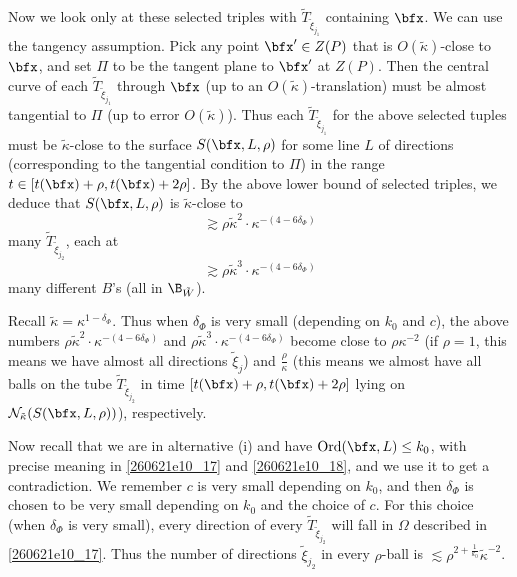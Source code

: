 \documentclass{article}
\numberwithin{equation}{section}
\theoremstyle{plain}
\begin{document}
Now we look only at these selected triples with $\tilde{T}_{\tilde{\xi}_{j_1}}$ containing $\bfx$. We can use the tangency assumption. Pick any point $\bfx' \in Z(P)$ that is $O(\tilde{\kappa})$-close to $\bfx$, and set $\Pi$ to be the tangent plane to $\bfx'$ at $Z(P)$. Then the central curve of each $\tilde{T}_{\tilde{\xi}_{j_1}}$ through $\bfx$ (up to an $O(\tilde{\kappa})$-translation) must be almost tangential to $\Pi$ (up to error $O(\tilde{\kappa})$). Thus each  $\tilde{T}_{\tilde{\xi}_{j_1}}$ for the above selected tuples must be $\tilde{\kappa}$-close to the surface $S(\bfx, L, \rho)$ for some line $L$ of directions (corresponding to the tangential condition to $\Pi$) in the range $t \in [t(\bfx)+\rho, t(\bfx)+2\rho]$. By the above lower bound of selected triples, we deduce that $S(\bfx, L, \rho)$ is $\tilde{\kappa}$-close to 
\begin{equation}
    \gtrsim \rho\tilde{\kappa}^2\cdot \kappa^{-(4-6\delta_{\Phi})}
\end{equation}
many $\tilde{T}_{\tilde{\xi}_{j_2}}$, each at 
\begin{equation}
    \gtrsim \rho\tilde{\kappa}^3\cdot \kappa^{-(4-6\delta_{\Phi})}
\end{equation}
many different $B$'s (all in $\B_{\tilde{W}}$).

Recall $\tilde{\kappa} = \kappa^{1-\delta_{\Phi}}$. Thus when $\delta_{\Phi}$ is very small (depending on $k_0$ and $c$), the above numbers $\rho\tilde{\kappa}^2\cdot \kappa^{-(4-6\delta_{\Phi})}$ and $\rho\tilde{\kappa}^3\cdot \kappa^{-(4-6\delta_{\Phi})}$ become close to $\rho\kappa^{-2}$ (if $\rho=1$, this means we have almost all directions $\tilde{\xi}_j$) and $\frac{\rho}{\kappa}$ (this means we almost have all balls on the tube $\tilde{T}_{\tilde{\xi}_{j_2}}$ in time $[t(\bfx)+\rho, t(\bfx)+2\rho]$ lying on $\mathcal{N}_{\tilde{\kappa}} (S(\bfx, L, \rho))$), respectively.

Now recall that we are in alternative (i) and have $\mathrm{Ord}(\bfx, L)\le k_0$, with precise meaning in \eqref{260621e10_17} and \eqref{260621e10_18}, and we use it to get a contradiction. We remember $c$ is very small depending on $k_0$, and then $\delta_{\Phi}$ is chosen to be very small depending on $k_0$ and the choice of $c$. For this choice (when $\delta_{\Phi}$ is very small), every direction of every $\tilde{T}_{\tilde{\xi}_{j_2}}$ will fall in $\Omega$ described in \eqref{260621e10_17}. Thus the number of directions $\tilde{\xi}_{j_2}$ in every $\rho$-ball
 is $\lesssim \rho^{2+\frac{1}{k_0}}\tilde{\kappa}^{-2}$.
\end{document}
